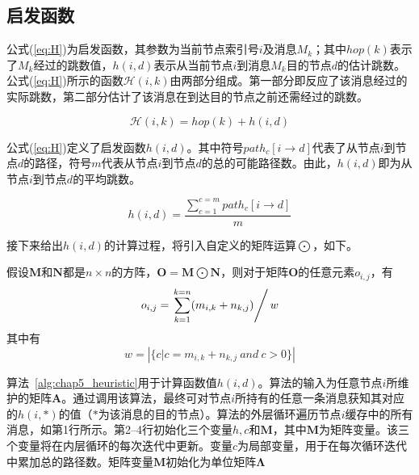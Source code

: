 \subsection{启发函数}
\label{chap5:启发函数}

公式(\ref{eq:H})为启发函数，其参数为当前节点索引号$i$及消息$M_k$；其中$hop(k)$表示了$M_k$经过的跳数值，$h(i,d)$表示从当前节点$i$到消息$M_k$目的节点$d$的估计跳数。公式(\ref{eq:H})所示的函数$\mathcal{H}(i,k)$由两部分组成。第一部分即反应了该消息经过的实际跳数，第二部分估计了该消息在到达目的节点之前还需经过的跳数。

\begin{equation}
\label{eq:H}
\mathcal{H}(i,k) = hop(k) + h(i, d)
\end{equation}

公式(\ref{eq:H})定义了启发函数$h(i,d)$。其中符号$path_c[i\rightarrow d]$代表了从节点$i$到节点$d$的路径，符号$m$代表从节点$i$到节点$d$的总的可能路径数。由此，$h(i,d)$即为从节点$i$到节点$d$的平均跳数。

\begin{equation}
\label{eq:h}
h(i, d) = \frac{\sum_{c=1}^{c=m}path_c[i\longrightarrow d]}{m}
\end{equation}

接下来给出$h(i,d)$的计算过程，将引入自定义的矩阵运算$\bigodot$，如下。

\begin{definition}
\label{def:bigodot}
假设$\bm{M}$和$\bm{N}$都是$n\times n$的方阵，$\bm{O}=\bm{M}\bigodot \bm{N}$，则对于矩阵$\bm{O}$的任意元素$o_{i,j}$，有
\begin{displaymath}
o_{i,j}=\left.\sum_{k=1}^{k=n}(m_{i,k}+n_{k,j})\right/w
\end{displaymath}
其中有
\begin{displaymath}
w=\left|\{c|c=m_{i,k}+n_{k,j}~and~c>0\}\right|
\end{displaymath}
\end{definition}

算法~\ref{alg:chap5_heuristic}用于计算函数值$h(i,d)$。算法的输入为任意节点$i$所维护的矩阵$\bm{A}$。通过调用该算法，最终可对节点$i$所持有的任意一条消息获知其对应的$h(i,*)$的值（$*$为该消息的目的节点）。算法的外层循环遍历节点$i$缓存中的所有消息，如第1行所示。第2--4行初始化三个变量$h,c$和$\bm{M}$，其中$\bm{M}$为矩阵变量。该三个变量将在内层循环的每次迭代中更新。变量$c$为局部变量，用于在每次循环迭代中累加总的路径数。矩阵变量$\bm{M}$初始化为单位矩阵$\bm{\Lambda}$

